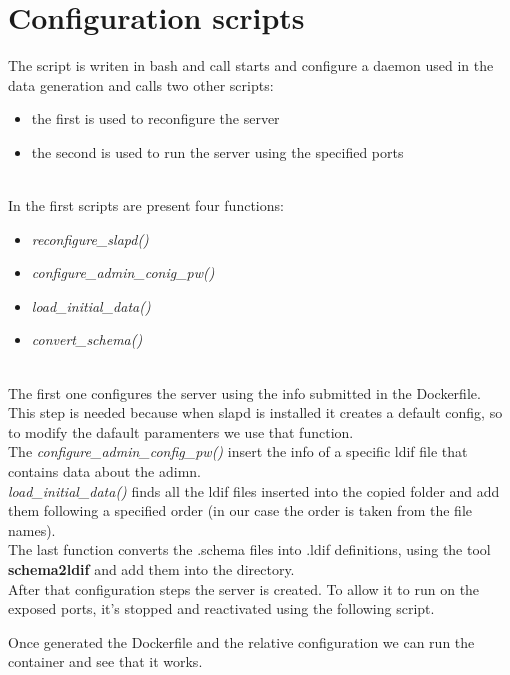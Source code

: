 \section{Configuration scripts}
The script is writen in bash and call starts and configure a daemon used in the data generation and calls two other scripts:
\begin{itemize}
    \item the first is used to reconfigure the server
    \item the second is used to run the server using the specified ports
\end{itemize}
\\
In the first scripts are present four functions:\\
\begin{itemize}
    \item \textit{reconfigure\_slapd()}
    \item \textit{configure\_admin\_conig\_pw()}
    \item \textit{load\_initial\_data()}
    \item \textit{convert\_schema()}
\end{itemize}
\\
The first one configures the server using the info submitted in the Dockerfile. This step is needed because when slapd is installed it creates a default config, so to modify the dafault paramenters we use that function.
\\
The \textit{configure\_admin\_config\_pw()} insert the info of a specific ldif file that contains data about the adimn.
\\
\textit{load\_initial\_data()} finds all the ldif files inserted into the copied folder and add them following a specified order (in our case the order is taken from the file names).
\\
The last function converts the .schema files into .ldif definitions, using the tool \textbf{schema2ldif} and add them into the directory.
\\
After that configuration steps the server is created. To allow it to run on the exposed ports, it's stopped and reactivated using the following script.
\begin{mdframed}[backgroundcolor=back]

\end{mdframed}
Once generated the Dockerfile and the relative configuration we can run the container and see that it works.
